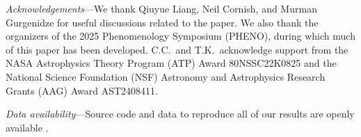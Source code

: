 \documentclass[prd,twocolumn,aps,psfig,nofootinbib,nobibnotes,superscriptaddress,preprintnumbers,times]{revtex4-2}
\begin{document}
\vspace{5mm}
\textit{Acknowledgements}---We thank Qiuyue Liang, Neil Cornish, and Murman Gurgenidze for useful discussions related to the paper. We also thank the organizers of the 2025 Phenomenology Symposium (PHENO), during which much of this paper has been developed. C.C.\ and T.K.\ acknowledge support from the NASA Astrophysics Theory Program (ATP) Award 80NSSC22K0825 and the National Science Foundation (NSF) Astronomy and Astrophysics Research Grants (AAG) Award AST2408411.

\vspace{5mm}
\textit{Data availability}---Source code and data to reproduce all of our results are openly available \cite{Choi:2025git}.





\clearpage
\end{document}
